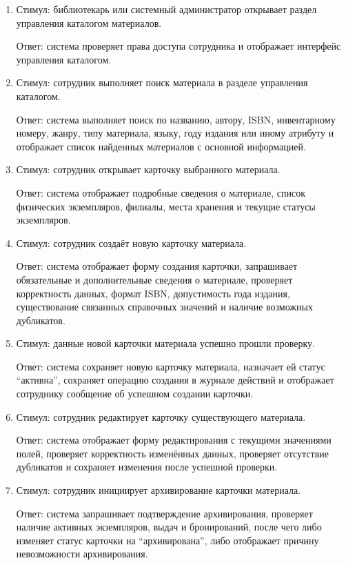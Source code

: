 \documentclass[12pt,a4paper]{article}
\begin{document}
	\begin{enumerate}
		\item Стимул: библиотекарь или системный администратор открывает раздел
		управления каталогом материалов.
		
		Ответ: система проверяет права доступа сотрудника и отображает интерфейс
		управления каталогом.
		
		\item Стимул: сотрудник выполняет поиск материала в разделе управления каталогом.
		
		Ответ: система выполняет поиск по названию, автору, ISBN, инвентарному номеру,
		жанру, типу материала, языку, году издания или иному атрибуту и отображает
		список найденных материалов с основной информацией.
		
		\item Стимул: сотрудник открывает карточку выбранного материала.
		
		Ответ: система отображает подробные сведения о материале, список физических
		экземпляров, филиалы, места хранения и текущие статусы экземпляров.
		
		\item Стимул: сотрудник создаёт новую карточку материала.
		
		Ответ: система отображает форму создания карточки, запрашивает обязательные
		и дополнительные сведения о материале, проверяет корректность данных,
		формат ISBN, допустимость года издания, существование связанных справочных
		значений и наличие возможных дубликатов.
		
		\item Стимул: данные новой карточки материала успешно прошли проверку.
		
		Ответ: система сохраняет новую карточку материала, назначает ей статус
		``активна'', сохраняет операцию создания в журнале действий и отображает
		сотруднику сообщение об успешном создании карточки.
		
		\item Стимул: сотрудник редактирует карточку существующего материала.
		
		Ответ: система отображает форму редактирования с текущими значениями полей,
		проверяет корректность изменённых данных, проверяет отсутствие дубликатов
		и сохраняет изменения после успешной проверки.
		
		\item Стимул: сотрудник инициирует архивирование карточки материала.
		
		Ответ: система запрашивает подтверждение архивирования, проверяет наличие
		активных экземпляров, выдач и бронирований, после чего либо изменяет статус
		карточки на ``архивирована'', либо отображает причину невозможности архивирования.
		

\end{enumerate}
\end{document}
